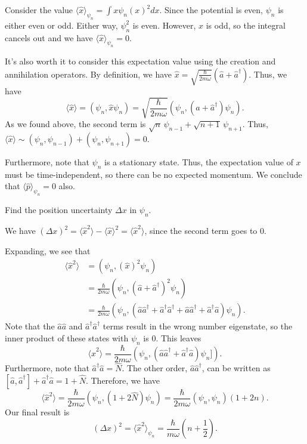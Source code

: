 \begin{framedansw*}
    Consider the value $\langle\hat{x}\rangle_{\psi_n}=\int x\psi_n(x)^2 dx$. Since the potential is even, $\psi_n$ is either even or odd. Either way, $\psi_n^2$ is even. However, $x$ is odd, so the integral cancels out and we have $\langle\hat{x}\rangle_{\psi_n}=0$.

    It's also worth it to consider this expectation value using the creation and annihilation operators. By definition, we have $\hat{x}=\sqrt{\frac{\hbar}{2m\omega}}(\hat{a}+\hat{a}^\dagger)$. Thus, we have $$\langle\hat{x}\rangle=(\psi_n,\hat{x}\psi_n)=\sqrt{\frac{\hbar}{2m\omega}}(\psi_n,(\hat{a}+\hat{a}^\dagger)\psi_n).$$As we found above, the second term is $\sqrt{n}\,\psi_{n-1}+\sqrt{n+1}\,\psi_{n+1}$. Thus, $\langle\hat{x}\rangle\sim(\psi_n,\psi_{n-1})+(\psi_n,\psi_{n+1})=0$.

    Furthermore, note that $\psi_n$ is a stationary state. Thus, the expectation value of $x$ must be time-independent, so there can be no expected momentum. We conclude that $\langle\hat{p}\rangle_{\psi_n}=0$ also.
\end{framedansw*}

\begin{framedexpl}
    Find the position uncertainty $\Delta x$ in $\psi_n$.
\end{framedexpl}

\begin{framedansw*}
    We have $(\Delta x)^2=\langle\hat{x}^2\rangle-\langle\hat{x}\rangle^2=\langle\hat{x}^2\rangle$, since the second term goes to $0$.

    Expanding, we see that \begin{align*}\langle\hat{x}^2\rangle&=(\psi_n,(\hat{x})^2\psi_n)\\ &=\frac{\hbar}{2m\omega}(\psi_n,(\hat{a}+\hat{a}^\dagger)^2\psi_n)\\ &=\frac{\hbar}{2m\omega}(\psi_n,(\hat{a}\hat{a}^\dagger+\hat{a}^\dagger\hat{a}^\dagger+\hat{a}\hat{a}^\dagger+\hat{a}^\dagger\hat{a})\psi_n).\end{align*}Note that the $\hat{a}\hat{a}$ and $\hat{a}^\dagger\hat{a}^\dagger$ terms result in the wrong number eigenstate, so the inner product of these states with $\psi_n$ is $0$. This leaves $$\langle\hat{x}^2\rangle=\frac{\hbar}{2m\omega}(\psi_n,(\hat{a}\hat{a}^\dagger+\hat{a}^\dagger\hat{a})\psi_n]).$$Furthermore, note that $\hat{a}^\dagger\hat{a}=\hat{N}$. The other order, $\hat{a}\hat{a}^\dagger$, can be written as $[\hat{a},\hat{a}^\dagger]+\hat{a}^\dagger\hat{a}=1+\hat{N}$. Therefore, we have $$\langle\hat{x}^2\rangle=\frac{\hbar}{2m\omega}(\psi_n,(1+2\hat{N})\psi_n)=\frac{\hbar}{2m\omega}(\psi_n,\psi_n)(1+2n).$$Our final result is $$\boxed{(\Delta x)^2=\langle\hat{x}^2\rangle_{\psi_n}=\frac{\hbar}{m\omega}(n+\frac{1}{2}).}$$
\end{framedansw*}